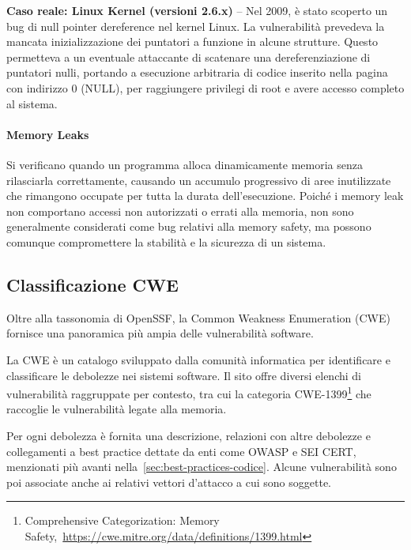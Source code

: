   \textbf{Caso reale: Linux Kernel (versioni 2.6.x)} -- Nel 2009, è stato scoperto
  un bug di null pointer dereference nel kernel Linux. La vulnerabilità prevedeva la
  mancata inizializzazione dei puntatori a funzione in alcune strutture. Questo
  permetteva a un eventuale attaccante di scatenare una dereferenziazione di
  puntatori nulli, portando a esecuzione arbitraria di codice inserito nella pagina
  con indirizzo 0 (NULL), per raggiungere privilegi di root e avere accesso
  completo al sistema.~\cite{null_pointer_dereference_linux}

  \paragraph{Memory Leaks}
  \label{sec:memory_leaks} Si verificano quando un programma alloca dinamicamente memoria
  senza rilasciarla correttamente, causando un accumulo progressivo di aree
  inutilizzate che rimangono occupate per tutta la durata dell'esecuzione. Poiché i
  memory leak non comportano accessi non autorizzati o errati alla memoria, non
  sono generalmente considerati come bug relativi alla memory safety, ma possono comunque
  compromettere la stabilità e la sicurezza di un sistema.

  \subsection{Classificazione CWE}
  Oltre alla tassonomia di OpenSSF, la Common Weakness Enumeration (CWE) fornisce
  una panoramica più ampia delle vulnerabilità software.

  La CWE è un catalogo sviluppato dalla comunità informatica per identificare e
  classificare le debolezze nei sistemi software. Il sito offre diversi elenchi di
  vulnerabilità raggruppate per contesto, tra cui la categoria CWE-1399\footnote{Comprehensive
  Categorization: Memory Safety,~\url{https://cwe.mitre.org/data/definitions/1399.html}}
  che raccoglie le vulnerabilità legate alla memoria.

  Per ogni debolezza è fornita una descrizione, relazioni con altre debolezze e
  collegamenti a best practice dettate da enti come OWASP e SEI CERT, menzionati più
  avanti nella~\autoref{sec:best-practices-codice}. Alcune vulnerabilità sono poi
  associate anche ai relativi vettori d'attacco a cui sono soggette.